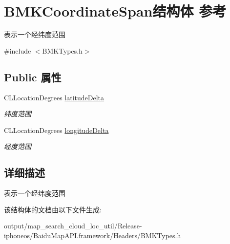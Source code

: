 \hypertarget{struct_b_m_k_coordinate_span}{}\section{B\+M\+K\+Coordinate\+Span结构体 参考}
\label{struct_b_m_k_coordinate_span}


表示一个经纬度范围  




{\ttfamily \#include $<$B\+M\+K\+Types.\+h$>$}

\subsection*{Public 属性}
\begin{DoxyCompactItemize}
\item 
\hypertarget{struct_b_m_k_coordinate_span_a759543f626366ce4fe599b8896f352a2}{}C\+L\+Location\+Degrees \hyperlink{struct_b_m_k_coordinate_span_a759543f626366ce4fe599b8896f352a2}{latitude\+Delta}\label{struct_b_m_k_coordinate_span_a759543f626366ce4fe599b8896f352a2}

\begin{DoxyCompactList}\small\item\em 纬度范围 \end{DoxyCompactList}\item 
\hypertarget{struct_b_m_k_coordinate_span_ab3bc7d18bbd0fce7c806c51f0e0df447}{}C\+L\+Location\+Degrees \hyperlink{struct_b_m_k_coordinate_span_ab3bc7d18bbd0fce7c806c51f0e0df447}{longitude\+Delta}\label{struct_b_m_k_coordinate_span_ab3bc7d18bbd0fce7c806c51f0e0df447}

\begin{DoxyCompactList}\small\item\em 经度范围 \end{DoxyCompactList}\end{DoxyCompactItemize}


\subsection{详细描述}
表示一个经纬度范围 

该结构体的文档由以下文件生成\+:\begin{DoxyCompactItemize}
\item 
output/map\+\_\+search\+\_\+cloud\+\_\+loc\+\_\+util/\+Release-\/iphoneos/\+Baidu\+Map\+A\+P\+I.\+framework/\+Headers/B\+M\+K\+Types.\+h\end{DoxyCompactItemize}
